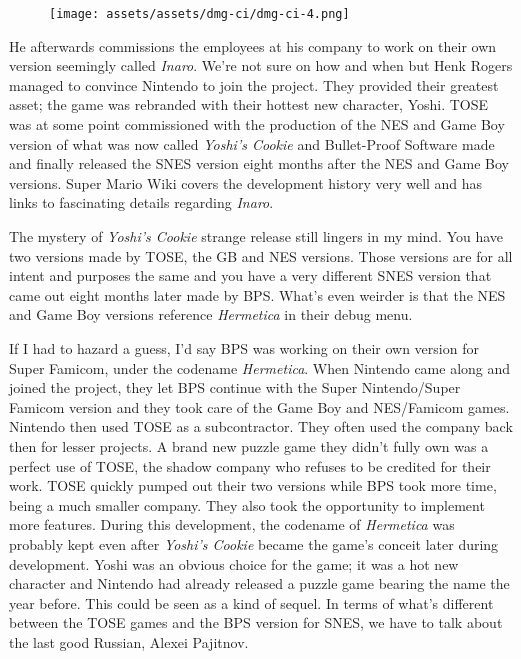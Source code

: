 \documentclass{book}
\let\oldcenter\center
\let\oldendcenter\endcenter
\renewenvironment{center}{\setlength\topsep{0pt}\oldcenter}{\oldendcenter}
\begin{document}
\begin{figure}[hbt]
\vskip 10pt
\centering \texttt{[image: assets/assets/dmg-ci/dmg-ci-4.png]}
\vskip 6pt
\end{figure}

He afterwards commissions the employees at his company to work on their own version seemingly called \emph{Inaro}. We’re not sure on how and when but Henk Rogers managed to convince Nintendo to join the project. They provided their greatest asset; the game was rebranded with their hottest new character, Yoshi. TOSE was at some point commissioned with the production of the NES and Game Boy version of what was now called \emph{Yoshi’s Cookie} and Bullet-Proof Software made and finally released the SNES version eight months after the NES and Game Boy versions. Super Mario Wiki covers the development history very well and has links to fascinating details regarding \emph{Inaro}.

\begin{center}
\vspace{8pt}
\quad\vspace{4pt}
\quad\vspace{4pt}
\end{center}

The mystery of \emph{Yoshi’s Cookie} strange release still lingers in my mind. You have two versions made by TOSE, the GB and NES versions. Those versions are for all intent and purposes the same and you have a very different SNES version that came out eight months later made by BPS. What’s even weirder is that the NES and Game Boy versions reference \emph{Hermetica} in their debug menu.

If I had to hazard a guess, I’d say BPS was working on their own version for Super Famicom, under the codename \emph{Hermetica}. When Nintendo came along and joined the project, they let BPS continue with the Super Nintendo/Super Famicom version and they took care of the Game Boy and NES/Famicom games. Nintendo then used TOSE as a subcontractor. They often used the company back then for lesser projects. A brand new puzzle game they didn’t fully own was a perfect use of TOSE, the shadow company who refuses to be credited for their work. TOSE quickly pumped out their two versions while BPS took more time, being a much smaller company. They also took the opportunity to implement more features. During this development, the codename of \emph{Hermetica} was probably kept even after \emph{Yoshi’s Cookie} became the game’s conceit later during development. Yoshi was an obvious choice for the game; it was a hot new character and Nintendo had already released a puzzle game bearing the name the year before. This could be seen as a kind of sequel. In terms of what’s different between the TOSE games and the BPS version for SNES, we have to talk about the last good Russian, Alexei Pajitnov.
\end{document}
